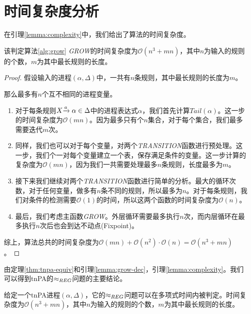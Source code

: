 \section{时间复杂度分析}
\label{sec:complexity}

在引理\ref{lemma:complexity}中，我们给出了算法的时间复杂度。

\begin{lem}\label{lemma:complexity}
该判定算法\ref{alg:grow} \textsl{GROW}的时间复杂度为$\mathcal{O}(n^3+mn)$，其中$n$为输入的规则的个数，$m$为其中最长规则的长度。
\end{lem}

\begin{proof}

假设输入的进程$(\alpha,\Delta)$中，一共有$n$条规则，其中最长规则的长度为$m$。

那么最多有$n$个互不相同的进程变量。
\begin{enumerate}

\item 对于每条规则$X{\xrightarrow{a}{}}\alpha\in\Delta$中的进程表达式$\alpha$，我们首先计算$Tail(\alpha)$。这一步的时间复杂度为$\mathcal{O}(mn)$。因为最多只有个$n$集合，对于每个集合，我们最多需要迭代$m$次。

\item 同样，我们也可以对于每个变量，对两个\textsl{TRANSITION}函数进行预处理。这一步，我们个一对每个变量建立一个表，保存满足条件的变量。这一步计算的复杂度为$\mathcal{O}(mn)$，因为我们一共需要处理最多$n$条规则，长度最多为$m$。

\item 接下来我们继续对两个\textsl{TRANSITION}函数进行简单的分析。最大的循环次数，对于任何变量，做多有$n$条不同的规则，所以最多为$n$。对于每条规则，我们对条件的检测需要$\mathcal{O}(1)$的时间，所以这两个函数的时间复杂度为$\mathcal{O}(n)$。

\item 最后，我们考虑主函数\textsl{GROW}。外层循环需要最多执行$n$次，而内层循环在最多执行$n$次后也会到达不动点(Fixpoint)。

\end{enumerate}
综上，算法总共的时间复杂度为$\mathcal{O}(mn)+\mathcal{O}(n^{2})\cdot \mathcal{O}(n)=\mathcal{O}(n^3+mn)$。
\end{proof}

由定理\ref{thm:tnpa-equiv}和引理\ref{lemma:grow-dec}，引理\ref{lemma:complexity}。我们可以得到tnPA的$\approx_{REG}$问题的主要结论。

\begin{thm}\label{thm:tnpa-wreg}
给定一个tnPA进程$(\alpha,\Delta)$，它的$\approx_{REG}$问题可以在多项式时间内被判定。时间复杂度为$\mathcal{O}(n^3+mn)$，其中$n$为输入的规则的个数，$m$为其中最长规则的长度。
\end{thm}

